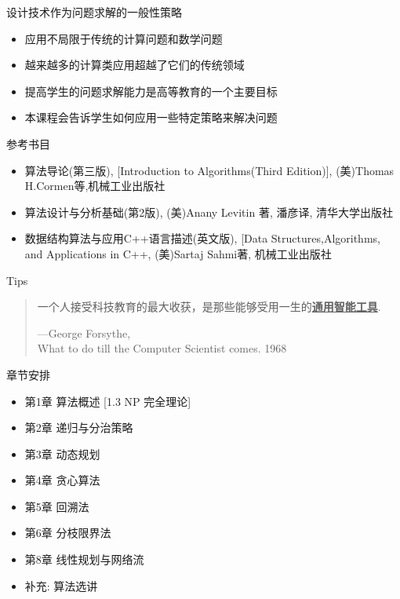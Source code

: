 \documentclass[fontset=fandol,UTF8,12pt,aspectratio=169,fleqn]{beamer}
\begin{document}
\begin{frame}{设计技术作为问题求解的一般性策略}
\begin{itemize}[<+-|alert@+>]
\item 应用不局限于传统的计算问题和数学问题 
\item 越来越多的计算类应用超越了它们的传统领域 
\item 提高学生的问题求解能力是高等教育的一个主要目标 
\item 本课程会告诉学生如何应用一些特定策略来解决问题 
\end{itemize}
\end{frame}

\begin{frame}{参考书目}
\begin{itemize}[<+-|alert@+>]
  \item 算法导论(第三版), [Introduction to Algorithms(Third Edition)], (美)Thomas
    H.Cormen等,机械工业出版社
\item 算法设计与分析基础(第2版), (美)Anany Levitin 著, 潘彦译, 清华大学出版社
\item 
数据结构算法与应用C++语言描述(英文版), [Data Structures,Algorithms, and Applications in C++,  (美)Sartaj Sahmi著, 机械工业出版社
\end{itemize}
\end{frame}

\begin{frame}{Tips}
  \begin{quote}
一个人接受科技教育的最大收获，是那些能够受用一生的\textbf{\underline{通用智能工具}}.

\hspace{6cm} ---George Forsythe, \\
\hspace{1.5cm} What to do till the Computer Scientist comes. 1968
\end{quote}
\end{frame}

\begin{frame}{章节安排}
\begin{itemize}[<+-|alert@+>]
\item 第1章 算法概述 [1.3 NP 完全理论]
\item 第2章 递归与分治策略
\item 第3章 动态规划
\item 第4章 贪心算法
\item 第5章 回溯法
\item 第6章 分枝限界法
\item 第8章 线性规划与网络流
\item 补\quad 充: 算法选讲
\end{itemize}
\end{frame}
\end{document}
